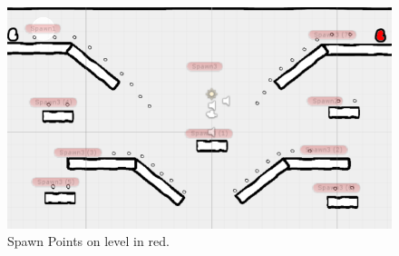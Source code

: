 \begin{figure}[h]
\centering
  \includegraphics[width= .8\linewidth]{Images/SpawnPoints.PNG}
  \caption{Spawn Points on level in red.}
  \label{fig:SpawnPoints}
  \end{figure}

